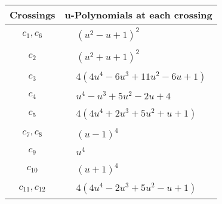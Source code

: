 \documentclass[1p]{elsarticle_modified}
\theoremstyle{definition}
\begin{document}
\begin{tabular}{m{50pt}|m{274pt}}
Crossings & \hspace{64pt}u-Polynomials at each crossing \\
\hline $$\begin{aligned}c_{1},c_{6}\end{aligned}$$&$\begin{aligned}
&(u^2- u+1)^2
\end{aligned}$\\
\hline $$\begin{aligned}c_{2}\end{aligned}$$&$\begin{aligned}
&(u^2+u+1)^2
\end{aligned}$\\
\hline $$\begin{aligned}c_{3}\end{aligned}$$&$\begin{aligned}
&4(4 u^4-6 u^3+11 u^2-6 u+1)
\end{aligned}$\\
\hline $$\begin{aligned}c_{4}\end{aligned}$$&$\begin{aligned}
&u^4- u^3+5 u^2-2 u+4
\end{aligned}$\\
\hline $$\begin{aligned}c_{5}\end{aligned}$$&$\begin{aligned}
&4(4 u^4+2 u^3+5 u^2+u+1)
\end{aligned}$\\
\hline $$\begin{aligned}c_{7},c_{8}\end{aligned}$$&$\begin{aligned}
&(u-1)^4
\end{aligned}$\\
\hline $$\begin{aligned}c_{9}\end{aligned}$$&$\begin{aligned}
&u^4
\end{aligned}$\\
\hline $$\begin{aligned}c_{10}\end{aligned}$$&$\begin{aligned}
&(u+1)^4
\end{aligned}$\\
\hline $$\begin{aligned}c_{11},c_{12}\end{aligned}$$&$\begin{aligned}
&4(4 u^4-2 u^3+5 u^2- u+1)
\end{aligned}$\\
\hline
\end{tabular}\\~\\
\end{document}
